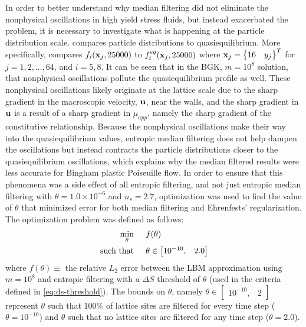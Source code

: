 In order to better understand why median filtering did not eliminate the nonphysical oscillations in high yield stress fluids, but instead exacerbated the problem, it is necessary to investigate what is happening at the particle distribution scale.
 compares particle distributions to quasiequilibrium.
More specifically,  compares $f_i(\mathbf{x}_j, 25000)$ to $f_i^{eq}(\mathbf{x}_j, 25000)$ where $\mathbf{x}_j = \begin{Bmatrix}16 & y_j\end{Bmatrix}^T$ for $j = 1, 2, ..., 64$, and $i = 5, 8$.
It can be seen that in the BGK, $m = 10^8$ solution, that nonphysical oscillations pollute the quasiequilibrium profile as well.
These nonphysical oscillations likely originate at the lattice scale due to the sharp gradient in the macroscopic velocity, $\mathbf{u}$, near the walls, and the sharp gradient in $\mathbf{u}$ is a result of a sharp gradient in $\mu_{app}$, namely the sharp gradient of the constitutive relationship.
Because the nonphysical oscillations make their way into the quasiequilibrium values, entropic median filtering does not help dampen the oscillations but instead contracts the particle distributions closer to the quasiequilibrium oscillations, which explains why the median filtered results were less accurate for Bingham plastic Poiseuille flow.
In order to ensure that this phenomena was a side effect of all entropic filtering, and not just entropic median filtering with $\theta = 1.0 \times 10^{-6}$ and $n_s = 2.7$, optimization was used to find the value of $\theta$ that minimized error for both median filtering and Ehrenfests' regularization.
The optimization problem was defined as follows:
\begin{align*}
  \min_\theta \hspace{0.2in} & f(\theta)\\
  \text{such that} \hspace{0.2in} & \theta \in \begin{bmatrix}10^{-10}, & 2.0\end{bmatrix}
\end{align*}
\noindent where $f(\theta) \equiv $ the relative $L_2$ error between the LBM approximation using $m = 10^8$ and entropic filtering with a $\Delta S$ threshold of $\theta$ (used in the criteria defined in \eqref{eq:ds-threshold}).
The bounds on $\theta$, namely $\theta \in \begin{bmatrix}10^{-10}, & 2\end{bmatrix}$ represent $\theta$ such that 100\% of lattice sites are filtered for every time step ($\theta = 10^{-10}$) and $\theta$ such that no lattice sites are filtered for any time step ($\theta = 2.0$).
